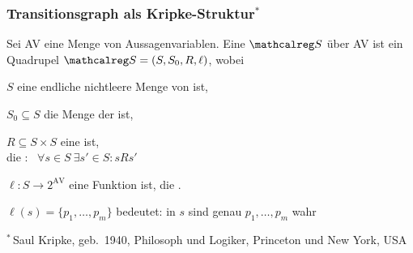     \begin{frame}
      \frametitle{Transitionsgraph als Kripke-Struktur${}^*$}
      
      \begin{Definition}
        Sei AV eine Menge von Aussagenvariablen.
        Eine  $\calS$ über AV ist ein Quadrupel $\calS=(S,S_0,R,\ell)$, wobei
        \begin{Itemize}
          \item
            $S$ eine endliche nichtleere Menge von  ist,
          \item
            $S_0 \subseteq S$ die Menge der  ist,
          \item<2->
            $R \subseteq S \times S$ eine  ist,\\
            die :~ $\forall s \in S~ \exists s' \in S : sRs'$
          \item<3->
            $\ell : S \to 2^{\text{AV}}$ eine Funktion ist, die .\\
            \begin{small}
              $\ell(s) = \{p_1,\dots,p_m\}$ bedeutet: in $s$ sind genau $p_1,\dots,p_m$ wahr
            \end{small}
        \end{Itemize}
        
        \par\medskip

      \end{Definition}

      \par\bigskip
      {\footnotesize ${}^*$\,Saul Kripke, geb.\ 1940, Philosoph und Logiker, Princeton und New York, USA}

    \end{frame}

